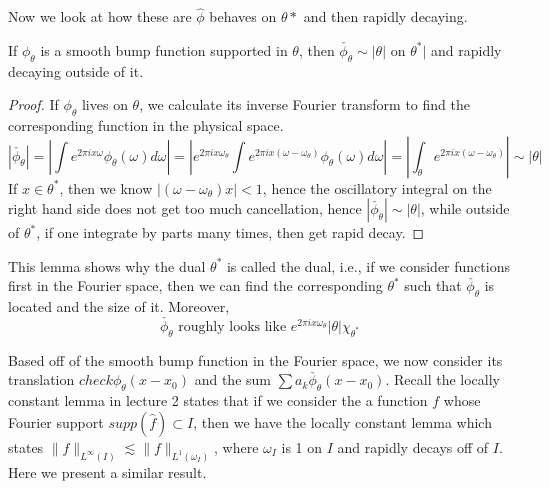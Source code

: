 Now we look at how these are $\widehat{\phi}$ behaves on $\theta*$ and then rapidly decaying. 
\begin{lemma}
    If $\phi_\theta$ is a smooth bump function supported in $\theta$, then $\check{\phi_\theta}\sim|\theta|$ on $\theta^*|$ and rapidly decaying outside of it.
\end{lemma}
\begin{proof}
    If $\phi_\theta$ lives on $\theta$, we calculate its inverse Fourier transform to find the corresponding function in the physical space. 
    \begin{equation*}
        |\check{\phi_\theta}|=\left|\int e^{2\pi ix\omega}\phi_\theta(\omega)d\omega \right|=\left|e^{2\pi ix\omega_\theta}\int e^{2\pi ix(\omega-\omega_\theta)}\phi_\theta(\omega)d\omega \right|=\left|\int_\theta e^{2\pi ix(\omega-\omega_\theta)} \right| \sim |\theta|
    \end{equation*}
    If $x\in\theta^*$, then we know $|(\omega-\omega_\theta)x|<1$, hence the oscillatory integral on the right hand side does not get too much cancellation, hence $|\check{\phi_\theta}|\sim|\theta|$, while outside of $\theta^*$, if one integrate by parts many times, then get rapid decay.
\end{proof}
\begin{remark}
    This lemma shows why the dual $\theta^*$ is called the dual, i.e., if we consider functions first in the Fourier space, then we can find the corresponding $\theta^*$ such that $\check{\phi_\theta}$ is located and the size of it. Moreover, 
    \begin{equation*}
        \check{\phi_\theta} \text{ roughly looks like } e^{2\pi i x\omega_\theta}|\theta|\chi_{\theta^*}
    \end{equation*}
\end{remark}

Based off of the smooth bump function in the Fourier space, we now consider its translation $check{\phi_\theta}(x-x_0)$ and the sum $\sum a_k\check{\phi_\theta}(x-x_0)$. Recall the locally constant lemma in lecture 2 states that if we consider the a function $f$ whose Fourier support $supp (\widehat{f})\subset I$, then we have the locally constant lemma which states $\|f\|_{L^\infty(I)}\lesssim \|f\|_{L^1(\omega_I)}$, where $\omega_I$ is 1 on $I$ and rapidly decays off of $I$. Here we present a similar result.

